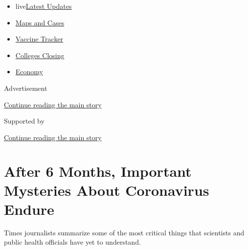 \begin{itemize}
\tightlist
\item
  live\href{https://www.nytimes3xbfgragh.onion/2020/08/21/world/covid-19-coronavirus.html?name=styln-coronavirus-national\&region=TOP_BANNER\&variant=undefined\&block=storyline_menu_recirc\&action=click\&pgtype=Article\&impression_id=dfebfb21-e398-11ea-88e1-ed0daa705d1f}{Latest
  Updates}
\item
  \href{https://www.nytimes3xbfgragh.onion/interactive/2020/us/coronavirus-us-cases.html?name=styln-coronavirus-national\&region=TOP_BANNER\&variant=undefined\&block=storyline_menu_recirc\&action=click\&pgtype=Article\&impression_id=dfebfb22-e398-11ea-88e1-ed0daa705d1f}{Maps
  and Cases}
\item
  \href{https://www.nytimes3xbfgragh.onion/interactive/2020/science/coronavirus-vaccine-tracker.html?name=styln-coronavirus-national\&region=TOP_BANNER\&variant=undefined\&block=storyline_menu_recirc\&action=click\&pgtype=Article\&impression_id=dfec2230-e398-11ea-88e1-ed0daa705d1f}{Vaccine
  Tracker}
\item
  \href{https://www.nytimes3xbfgragh.onion/2020/08/19/us/colleges-closing-covid.html?name=styln-coronavirus-national\&region=TOP_BANNER\&variant=undefined\&block=storyline_menu_recirc\&action=click\&pgtype=Article\&impression_id=dfec2231-e398-11ea-88e1-ed0daa705d1f}{Colleges
  Closing}
\item
  \href{https://www.nytimes3xbfgragh.onion/live/2020/08/20/business/stock-market-today-coronavirus?name=styln-coronavirus-national\&region=TOP_BANNER\&variant=undefined\&block=storyline_menu_recirc\&action=click\&pgtype=Article\&impression_id=dfec2232-e398-11ea-88e1-ed0daa705d1f}{Economy}
\end{itemize}

Advertisement

\protect\hyperlink{after-top}{Continue reading the main story}

Supported by

\protect\hyperlink{after-sponsor}{Continue reading the main story}

\hypertarget{after-6-months-important-mysteries-about-coronavirus-endure}{%
\section{After 6 Months, Important Mysteries About Coronavirus
Endure}\label{after-6-months-important-mysteries-about-coronavirus-endure}}

Times journalists summarize some of the most critical things that
scientists and public health officials have yet to understand.

